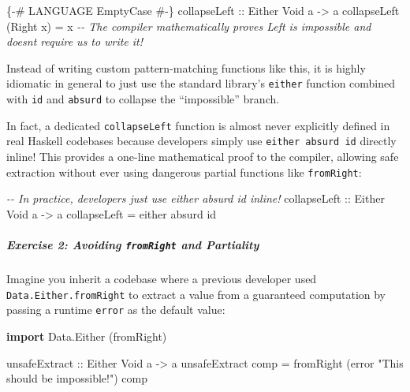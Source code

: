 \documentclass[
]{article}
\newenvironment{Shaded}{}{}
\newcommand{\CommentTok}[1]{\textcolor[rgb]{0.38,0.63,0.69}{\textit{#1}}}
\newcommand{\DataTypeTok}[1]{\textcolor[rgb]{0.56,0.13,0.00}{#1}}
\newcommand{\FunctionTok}[1]{\textcolor[rgb]{0.02,0.16,0.49}{#1}}
\newcommand{\KeywordTok}[1]{\textcolor[rgb]{0.00,0.44,0.13}{\textbf{#1}}}
\newcommand{\NormalTok}[1]{#1}
\newcommand{\OtherTok}[1]{\textcolor[rgb]{0.00,0.44,0.13}{#1}}
\newcommand{\StringTok}[1]{\textcolor[rgb]{0.25,0.44,0.63}{#1}}
\begin{document}
\begin{Shaded}
\begin{Highlighting}[]
\OtherTok{\{{-}\# LANGUAGE EmptyCase \#{-}\}}
\OtherTok{collapseLeft ::} \DataTypeTok{Either} \DataTypeTok{Void}\NormalTok{ a }\OtherTok{{-}\textgreater{}}\NormalTok{ a}
\NormalTok{collapseLeft (}\DataTypeTok{Right}\NormalTok{ x) }\OtherTok{=}\NormalTok{ x}
\CommentTok{{-}{-} The compiler mathematically proves Left is impossible and doesn\textquotesingle{}t require us to write it!}
\end{Highlighting}
\end{Shaded}

Instead of writing custom pattern-matching functions like this, it is
highly idiomatic in general to just use the standard library's
\texttt{either} function combined with \texttt{id} and \texttt{absurd}
to collapse the ``impossible'' branch.

In fact, a dedicated \texttt{collapseLeft} function is almost never
explicitly defined in real Haskell codebases because developers simply
use \texttt{either\ absurd\ id} directly inline! This provides a
one-line mathematical proof to the compiler, allowing safe extraction
without ever using dangerous partial functions like \texttt{fromRight}:

\begin{Shaded}
\begin{Highlighting}[]
\CommentTok{{-}{-} In practice, developers just use \textasciigrave{}either absurd id\textasciigrave{} inline!}
\OtherTok{collapseLeft ::} \DataTypeTok{Either} \DataTypeTok{Void}\NormalTok{ a }\OtherTok{{-}\textgreater{}}\NormalTok{ a}
\NormalTok{collapseLeft }\OtherTok{=} \FunctionTok{either}\NormalTok{ absurd }\FunctionTok{id}
\end{Highlighting}
\end{Shaded}

\subparagraph{\texorpdfstring{Exercise 2: Avoiding \texttt{fromRight}
and
Partiality}{Exercise 2: Avoiding fromRight and Partiality}}\label{exercise-2-avoiding-fromright-and-partiality}

Imagine you inherit a codebase where a previous developer used
\texttt{Data.Either.fromRight} to extract a value from a guaranteed
computation by passing a runtime \texttt{error} as the default value:

\begin{Shaded}
\begin{Highlighting}[]
\KeywordTok{import} \DataTypeTok{Data.Either}\NormalTok{ (fromRight)}

\OtherTok{unsafeExtract ::} \DataTypeTok{Either} \DataTypeTok{Void}\NormalTok{ a }\OtherTok{{-}\textgreater{}}\NormalTok{ a}
\NormalTok{unsafeExtract comp }\OtherTok{=}\NormalTok{ fromRight (}\FunctionTok{error} \StringTok{"This should be impossible!"}\NormalTok{) comp}
\end{Highlighting}
\end{Shaded}
\end{document}
